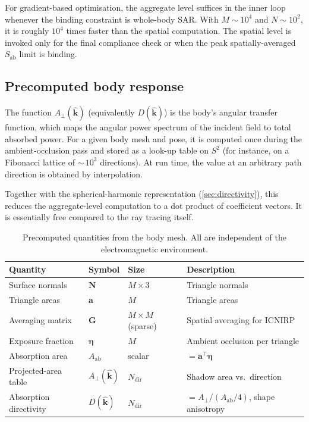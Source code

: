 \documentclass[11pt,a4paper]{article}
\theoremstyle{definition}      %
\newcommand{\khat}{\hat{\bm{k}}}
\newcommand{\Sab}{S_{\mathrm{ab}}}
\newcommand{\Aab}{A_{\mathrm{ab}}}
\newcommand{\Aperp}{A_{\perp}}
\begin{document}
For gradient-based optimisation, the aggregate level suffices in the
inner loop whenever the binding constraint is whole-body SAR.  With
$M\sim 10^4$ and $N\sim 10^2$, it is roughly $10^4$ times faster than
the spatial computation.  The spatial level is invoked only for the
final compliance check or when the peak spatially-averaged $\Sab$
limit is binding.

\subsection{Precomputed body response}\label{sec:precomputed}

The function $\Aperp(\khat)$ (equivalently $D(\khat)$) is the
body's angular transfer function, which maps the angular power spectrum
of the incident field to total absorbed power.  For a given
body mesh and pose, it is computed once during the ambient-occlusion
pass and stored as a look-up table on $S^2$ (for instance, on a
Fibonacci lattice of ${\sim}\,10^3$ directions).  At run time, the
value at an arbitrary path direction is obtained by interpolation.

Together with the spherical-harmonic representation
(\cref{sec:directivity}), this reduces the aggregate-level computation
to a dot product of coefficient vectors. It is essentially free compared to
the ray tracing itself.

\begin{table}[!htbp]
\centering
\caption{Precomputed quantities from the body mesh.  All are
  independent of the electromagnetic environment.}
\label{tab:precomputed}
\begin{tabular}{llll}
\toprule
Quantity & Symbol & Size & Description \\
\midrule
Surface normals & $\mathbf{N}$ & $M\times 3$ & Triangle normals \\
Triangle areas & $\mathbf{a}$ & $M$ & Triangle areas \\
Averaging matrix & $\mathbf{G}$ & $M\times M$ (sparse)
  & Spatial averaging for ICNIRP \\
Exposure fraction & $\bm{\eta}$ & $M$
  & Ambient occlusion per triangle \\
Absorption area & $\Aab$ & scalar & $=\mathbf{a}^\top\bm{\eta}$ \\
Projected-area table & $\Aperp(\khat)$ & $N_{\mathrm{dir}}$
  & Shadow area vs.\ direction \\
Absorption directivity & $D(\khat)$ & $N_{\mathrm{dir}}$
  & $=\Aperp/(\Aab/4)$, shape anisotropy \\
\bottomrule
\end{tabular}
\end{table}
\end{document}
